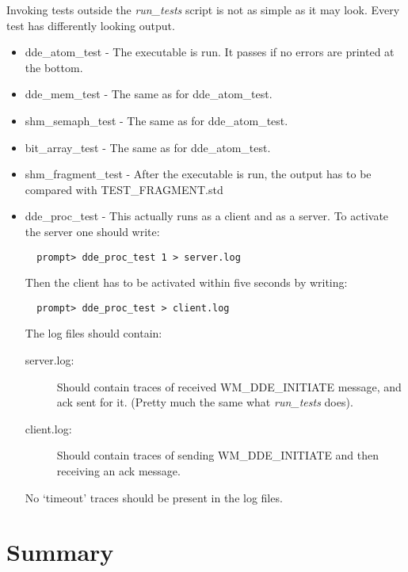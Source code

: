 Invoking tests outside the {\em run\_tests}{} script is not as simple
as it may look. Every test has differently looking output.
\begin{itemize}
  \item dde\_atom\_test - The executable is run. It passes if no
    errors are printed at the bottom. 
  \item dde\_mem\_test - The same as for dde\_atom\_test.
  \item shm\_semaph\_test - The same as for dde\_atom\_test.
  \item bit\_array\_test -  The same as for dde\_atom\_test.
  \item shm\_fragment\_test - After the executable is run,  the output
    has to be compared with TEST\_FRAGMENT.std 
  \item dde\_proc\_test - This actually runs as a client and as a
    server. To activate the server one should write:
\begin{verbatim}
  prompt> dde_proc_test 1 > server.log
\end{verbatim}
    Then the client has to be activated within five seconds by
    writing:
\begin{verbatim}
  prompt> dde_proc_test > client.log
\end{verbatim}
    The log files should contain:
    \begin{description}
      \item[server.log:] Should contain traces of received
        WM\_DDE\_INITIATE message, and ack sent for it. (Pretty much
        the same what  {\em run\_tests}{} does).  
      \item[client.log:] Should contain traces of sending
        WM\_DDE\_INITIATE and then receiving an ack message.
    \end{description}
    No `timeout' traces should be present in the log files.

\end{itemize}


\section{Summary}
